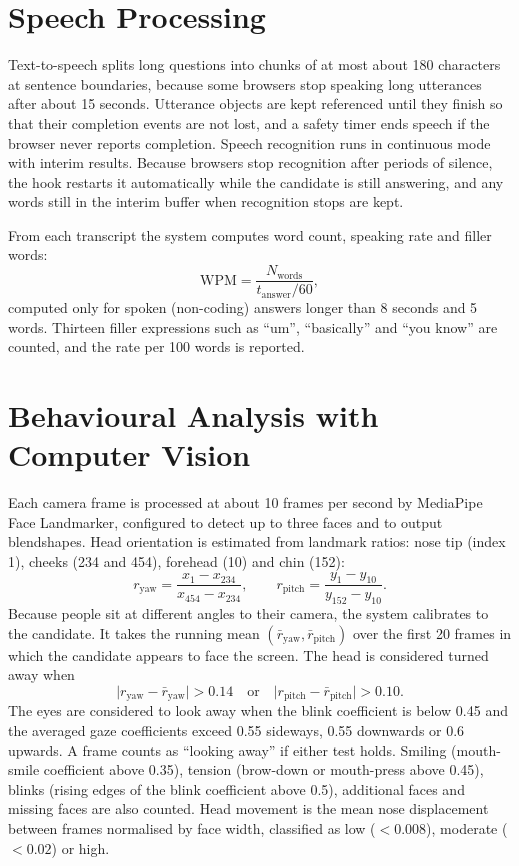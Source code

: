 \documentclass[12pt,a4paper,oneside]{report}
\begin{document}
\section{Speech Processing}
Text-to-speech splits long questions into chunks of at most about 180 characters at sentence boundaries, because some browsers stop speaking long utterances after about 15 seconds. Utterance objects are kept referenced until they finish so that their completion events are not lost, and a safety timer ends speech if the browser never reports completion. Speech recognition runs in continuous mode with interim results. Because browsers stop recognition after periods of silence, the hook restarts it automatically while the candidate is still answering, and any words still in the interim buffer when recognition stops are kept.

From each transcript the system computes word count, speaking rate and filler words:
\begin{equation}
\text{WPM} = \frac{N_{\text{words}}}{t_{\text{answer}} / 60},
\end{equation}
computed only for spoken (non-coding) answers longer than 8 seconds and 5 words. Thirteen filler expressions such as ``um'', ``basically'' and ``you know'' are counted, and the rate per 100 words is reported.

\section{Behavioural Analysis with Computer Vision}
Each camera frame is processed at about 10 frames per second by MediaPipe Face Landmarker, configured to detect up to three faces and to output blendshapes. Head orientation is estimated from landmark ratios: nose tip (index 1), cheeks (234 and 454), forehead (10) and chin (152):
\begin{equation}
r_{\text{yaw}} = \frac{x_{1} - x_{234}}{x_{454} - x_{234}}, \qquad
r_{\text{pitch}} = \frac{y_{1} - y_{10}}{y_{152} - y_{10}}.
\end{equation}
Because people sit at different angles to their camera, the system calibrates to the candidate. It takes the running mean $(\bar r_{\text{yaw}}, \bar r_{\text{pitch}})$ over the first 20 frames in which the candidate appears to face the screen. The head is considered turned away when
\begin{equation}
\lvert r_{\text{yaw}} - \bar r_{\text{yaw}} \rvert > 0.14 \quad \text{or} \quad \lvert r_{\text{pitch}} - \bar r_{\text{pitch}} \rvert > 0.10 .
\end{equation}
The eyes are considered to look away when the blink coefficient is below 0.45 and the averaged gaze coefficients exceed 0.55 sideways, 0.55 downwards or 0.6 upwards. A frame counts as ``looking away'' if either test holds. Smiling (mouth-smile coefficient above 0.35), tension (brow-down or mouth-press above 0.45), blinks (rising edges of the blink coefficient above 0.5), additional faces and missing faces are also counted. Head movement is the mean nose displacement between frames normalised by face width, classified as low ($<0.008$), moderate ($<0.02$) or high.
\end{document}
